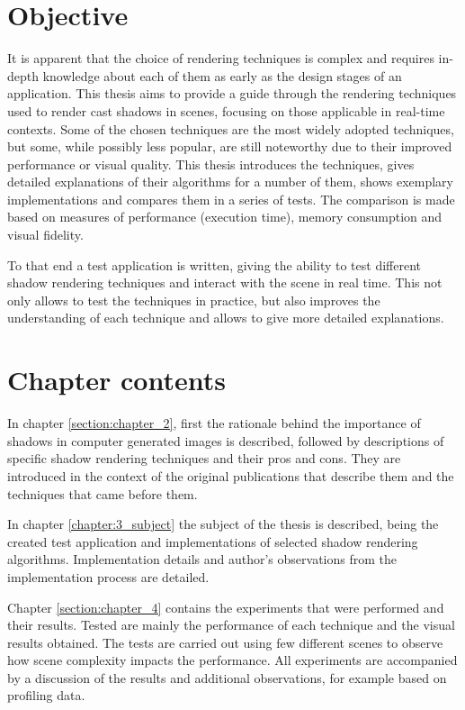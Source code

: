 \section{Objective}

It is apparent that the choice of rendering techniques is complex and requires in-depth knowledge about each of them as early as the design stages of an application. This thesis aims to provide a guide through the rendering techniques used to render cast shadows in scenes, focusing on those applicable in real-time contexts. Some of the chosen techniques are the most widely adopted techniques, but some, while possibly less popular, are  still noteworthy due to their improved performance or visual quality. This thesis introduces the techniques, gives detailed explanations of their algorithms for a number of them, shows exemplary implementations and compares them in a series of tests. The comparison is made based on measures of performance (execution time), memory consumption and visual fidelity.

To that end a test application is written, giving the ability to test different shadow rendering techniques and interact with the scene in real time. This not only allows to test the techniques in practice, but also improves the understanding of each technique and allows to give more detailed explanations.

\section{Chapter contents}
In chapter \ref{section:chapter_2}, first the rationale behind the importance of shadows in computer generated images is described, followed by descriptions of specific shadow rendering techniques and their pros and cons. They are introduced in the context of the original publications that describe them and the techniques that came before them.

In chapter \ref{chapter:3_subject} the subject of the thesis is described, being the created test application and implementations of selected shadow rendering algorithms. Implementation details and author's observations from the implementation process are detailed.

Chapter \ref{section:chapter_4} contains the experiments that were performed and their results. Tested are mainly the performance of each technique and the visual results obtained. The tests are carried out using few different scenes to observe how scene complexity impacts the performance. All experiments are accompanied by a discussion of the results and additional observations, for example based on profiling data.

